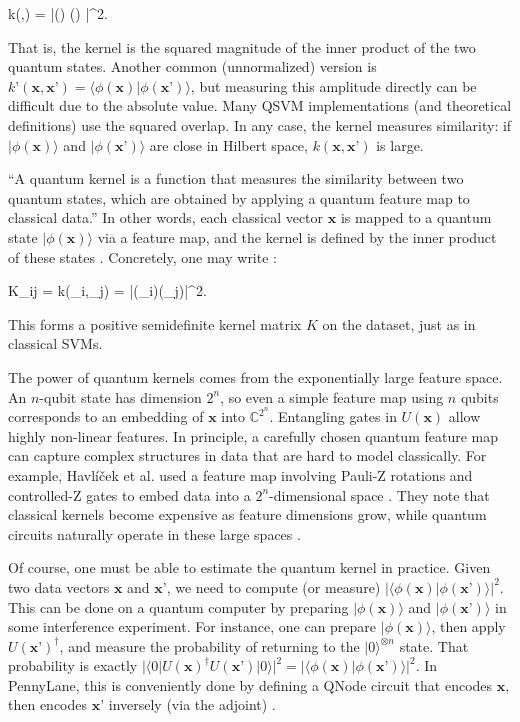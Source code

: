 k(,) = \bigl|\langle \phi() \mid \phi() \rangle\bigr|^2.

That is, the kernel is the squared magnitude of the inner product of the two quantum states.  Another common (unnormalized) version is $k’(\mathbf{x},\mathbf{x}’) = \langle \phi(\mathbf{x}) | \phi(\mathbf{x}’) \rangle$, but measuring this amplitude directly can be difficult due to the absolute value.  Many QSVM implementations (and theoretical definitions) use the squared overlap.  In any case, the kernel measures similarity: if $|\phi(\mathbf{x})\rangle$ and $|\phi(\mathbf{x}’)\rangle$ are close in Hilbert space, $k(\mathbf{x},\mathbf{x}’)$ is large.



“A quantum kernel is a function that measures the similarity between two quantum states, which are obtained by applying a quantum feature map to classical data.”  In other words, each classical vector $\mathbf{x}$ is mapped to a quantum state $|\phi(\mathbf{x})\rangle$ via a feature map, and the kernel is defined by the inner product of these states .  Concretely, one may write :

K_{ij} \;=\; k(_i,_j) \;=\; \bigl|\langle \phi(_i)\mid\phi(_j)\rangle\bigr|^2.

This forms a positive semidefinite kernel matrix $K$ on the dataset, just as in classical SVMs.



The power of quantum kernels comes from the exponentially large feature space.  An $n$-qubit state has dimension $2^n$, so even a simple feature map using $n$ qubits corresponds to an embedding of $\mathbf{x}$ into $\mathbb{C}^{2^n}$.  Entangling gates in $U(\mathbf{x})$ allow highly non-linear features.  In principle, a carefully chosen quantum feature map can capture complex structures in data that are hard to model classically.  For example, Havlíček et al. used a feature map involving Pauli-Z rotations and controlled-Z gates to embed data into a $2^n$-dimensional space .  They note that classical kernels become expensive as feature dimensions grow, while quantum circuits naturally operate in these large spaces .



Of course, one must be able to estimate the quantum kernel in practice.  Given two data vectors $\mathbf{x}$ and $\mathbf{x}’$, we need to compute (or measure) $|\langle\phi(\mathbf{x})|\phi(\mathbf{x}’)\rangle|^2$.  This can be done on a quantum computer by preparing $|\phi(\mathbf{x})\rangle$ and $|\phi(\mathbf{x}’)\rangle$ in some interference experiment.  For instance, one can prepare $|\phi(\mathbf{x})\rangle$, then apply $U(\mathbf{x}’)^\dagger$, and measure the probability of returning to the $|0\rangle^{\otimes n}$ state.  That probability is exactly $|\langle 0|U(\mathbf{x})^\dagger U(\mathbf{x}’)|0\rangle|^2 = |\langle\phi(\mathbf{x})|\phi(\mathbf{x}’)\rangle|^2$.  In PennyLane, this is conveniently done by defining a QNode circuit that encodes $\mathbf{x}$, then encodes $\mathbf{x}’$ inversely (via the adjoint) .



